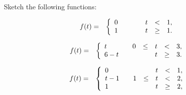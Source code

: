 \begin{problem}
\item Sketch the following functions:

  \begin{subproblem}
  \item 
    \begin{eqnarray*}
      f(t) & = & \left\{
        \begin{array}{l@{\hspace{2em}}rcccl}
          0 &    &  & t & < & 1, \\
          1 &    &  & t & \geq & 1. \\
        \end{array}
      \right.
    \end{eqnarray*}
    \vfill

  \item 
    \begin{eqnarray*}
      f(t) & = & \left\{
        \begin{array}{l@{\hspace{2em}}rcccl}
          t & 0 & \leq & t & < & 3, \\
          6-t &  &     & t & \geq & 3. \\
        \end{array}
      \right.
    \end{eqnarray*}
    \vfill

  \item 
    \begin{eqnarray*}
      f(t) & = & \left\{
        \begin{array}{l@{\hspace{2em}}rcccl}
          0   &    &  & t & < & 1, \\
          t-1 &  1 & \leq & t & < & 2, \\
          1   &    &      & t & \geq & 2, \\
        \end{array}
      \right.
    \end{eqnarray*}
    \vfill

  \end{subproblem}

\end{problem}

